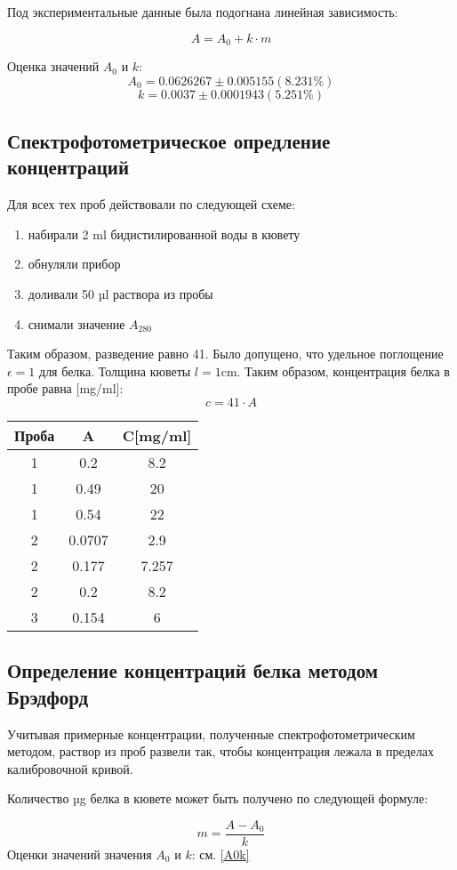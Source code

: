 Под экспериментальные данные была подогнана линейная зависимость:

$$ A = A_0 + k \cdot m $$

Оценка значений $A_0$ и $k$:
$$ A_0 = 0.0626267 \pm 0.005155 (8.231\%) $$
$$ k = 0.0037 \pm 0.0001943 (5.251\%) $$



\subsection{Спектрофотометрическое опредление концентраций}
Для всех тех проб действовали по следующей схеме:
\begin{enumerate}
\item набирали 2 ml бидистилированной воды в кювету
\item обнуляли прибор
\item доливали 50 µl раствора из пробы
\item снимали значение $A_{280}$
\end{enumerate}
Таким образом, разведение равно 41.
Было допущено, что удельное поглощение $\epsilon = 1$ для белка.
Толщина кюветы $l = 1 \text{cm}$.
Таким образом, концентрация белка в пробе равна [mg/ml]:
$$ c=41 \cdot A $$

\begin{tabular}{|c|c|c|}
\hline
Проба & A & C[mg/ml] \\
\hline
1 & 0.2 & 8.2 \\
1 & 0.49 & 20 \\
1 & 0.54 & 22 \\
\hline
2 & 0.0707 & 2.9 \\
2 & 0.177 & 7.257 \\
2 & 0.2 & 8.2 \\
\hline
3 & 0.154 & 6 \\
\hline
\end{tabular}

\subsection{Определение концентраций белка методом Брэдфорд}

Учитывая примерные концентрации, полученные спектрофотометрическим методом,
раствор из проб развели так, чтобы концентрация лежала в пределах
калибровочной кривой.

Количество µg белка в кювете может быть получено по следующей формуле:

$$ m = \frac{A-A_0}{k} $$
Оценки значений значения $A_0$ и $k$: см. \ref {A0k}

